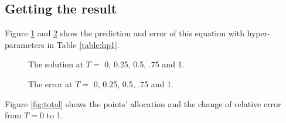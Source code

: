 \documentclass[11pt, a4paper]{article}
\begin{document}
    \subsection{Getting the result}

    Figure \ref{fig:sol} and \ref{fig:error} show the prediction and error of this equation with hyper-parameters in Table \ref{table:hp1}.
    
    \begin{figure}[htb!]
        \caption{The solution at $T=$ 0, 0.25, 0.5, .75 and 1.}
        \label{fig:sol}
    \end{figure}

    \begin{figure}[ht!]
        \caption{The error at $T=$ 0, 0.25, 0.5, .75 and 1.}
        \label{fig:error}
    \end{figure}


    Figure \ref{fig:total} shows the points' allocation and the change of relative error from $T=0$ to 1. 
\end{document}
